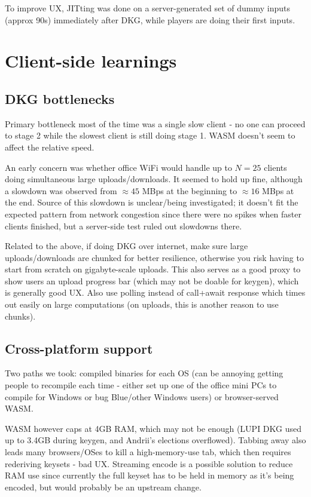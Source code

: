 \documentclass{article}
\begin{document}
To improve UX, JITting was done on a server-generated set of dummy inputs (approx 90s) immediately after DKG, while players are doing their first inputs.

\section{Client-side learnings}
\subsection{DKG bottlenecks}
Primary bottleneck most of the time was a single slow client - no one can proceed to stage 2 while the slowest client is still doing stage 1. 
WASM doesn't seem to affect the relative speed.

An early concern was whether office WiFi would handle up to $N=25$ clients doing simultaneous large uploads/downloads.
It seemed to hold up fine, although a slowdown was observed from $\approx 45$ MBps at the beginning to $\approx 16$ MBps at the end.
Source of this slowdown is unclear/being investigated; it doesn't fit the expected pattern from network congestion since there were no spikes when faster clients finished, but a server-side test ruled out slowdowns there.

Related to the above, if doing DKG over internet, make sure large uploads/downloads are chunked for better resilience, otherwise you risk having to start from scratch on gigabyte-scale uploads.
This also serves as a good proxy to show users an upload progress bar (which may not be doable for keygen), which is generally good UX.
Also use polling instead of call+await response which times out easily on large computations (on uploads, this is another reason to use chunks).

\subsection{Cross-platform support}
Two paths we took: compiled binaries for each OS (can be annoying getting people to recompile each time - either set up one of the office mini PCs to compile for Windows or bug Blue/other Windows users) or browser-served WASM.

WASM however caps at 4GB RAM, which may not be enough (LUPI DKG used up to 3.4GB during keygen, and Andrii's elections overflowed). Tabbing away also leads many browsers/OSes to kill a high-memory-use tab, which then requires rederiving keysets - bad UX. 
Streaming encode is a possible solution to reduce RAM use since currently the full keyset has to be held in memory as it's being encoded, but would probably be an upstream change.
\end{document}
